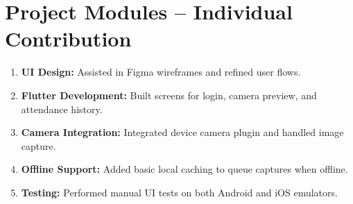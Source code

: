 \documentclass[openany]{report}
\begin{document}
\section{Project Modules – Individual Contribution}
\begin{enumerate}
  \item \textbf{UI Design:} Assisted in Figma wireframes and refined user flows.
  \item \textbf{Flutter Development:} Built screens for login, camera preview, and attendance history.
  \item \textbf{Camera Integration:} Integrated device camera plugin and handled image capture.
  \item \textbf{Offline Support:} Added basic local caching to queue captures when offline.
  \item \textbf{Testing:} Performed manual UI tests on both Android and iOS emulators.
\end{enumerate}
\end{document}
